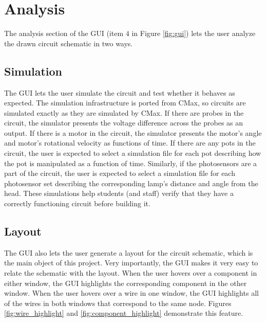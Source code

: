 \section{Analysis}

The analysis section of the GUI (item $4$ in Figure \ref{fig:gui}) lets the user
analyze the drawn circuit schematic in two ways.

\subsection{Simulation}

The GUI lets the user simulate the circuit and test whether it behaves as
expected. The simulation infrastructure is ported from CMax, so circuits
are simulated exactly as they are simulated by CMax. If there are probes in the
circuit, the simulator presents the voltage difference across the probes as an
output. If there is a motor in the circuit, the simulator presents the motor's
angle and motor's rotational velocity as functions of time. If there are any
pots in the circuit, the user is expected to select a simulation file for each
pot describing how the pot is manipulated as a function of time. Similarly,
if the photosensors are a part of the circuit, the user is expected to select
a simulation file for each photosensor set describing the corresponding lamp's
distance and
angle from the head. These simulations help students (and staff) verify that
they have a correctly functioning circuit before building it.

\subsection{Layout}

The GUI also lets the user generate a layout for the circuit schematic, which is
the main object of this project. Very importantly, the GUI makes it very easy to
relate the schematic with the layout. When the user hovers over a component in
either window, the GUI highlights the corresponding component in the other
window. When the user hovers over a wire in one window, the GUI highlights all
of the wires in both windows that correspond to the same node. Figures
\ref{fig:wire_highlight} and \ref{fig:component_highlight} demonstrate this
feature.

